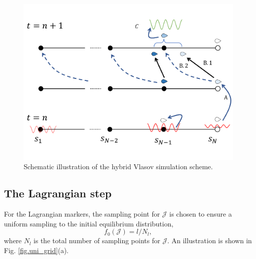 \begin{figure}[htbp]
    \centering
    \includegraphics[scale=0.5]{cpc_img/Hybrid_demo.pdf}
    \caption{Schematic illustration of the hybrid Vlasov simulation scheme.}
    \label{fig.demo}
\end{figure}

\subsection{The Lagrangian step}
For the Lagrangian markers,
the sampling point for $\mathcal{J}$ is chosen to ensure  a uniform sampling to the initial equilibrium distribution,
\begin{equation}
    f_0(\mathcal{J}) = l/N_l, 
\end{equation}
where $N_l$ is the total number of sampling points for $\mathcal{J}$. An illustration is shown in Fig. \ref{fig.uni_grid}(a).

